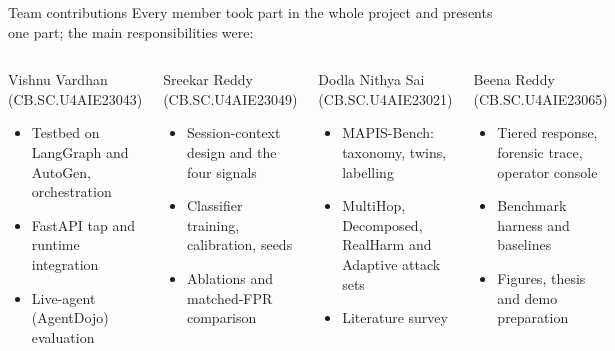 \documentclass[aspectratio=169,10pt]{beamer}
\newcommand{\MemberA}{Dodla Nithya Sai (CB.SC.U4AIE23021)}
\newcommand{\MemberB}{Vishnu Vardhan (CB.SC.U4AIE23043)}
\newcommand{\MemberC}{Sreekar Reddy (CB.SC.U4AIE23049)}
\newcommand{\MemberD}{Beena Reddy (CB.SC.U4AIE23065)}
\begin{document}
\begin{frame}{Team contributions}
  \small Every member took part in the whole project and presents one part; the main responsibilities were:\\[3mm]
  \begin{columns}[T]
    \begin{block}{\MemberB}
      \small
      \begin{itemize}
        \item Testbed on LangGraph and AutoGen, orchestration
        \item FastAPI tap and runtime integration
        \item Live-agent (AgentDojo) evaluation
      \end{itemize}
    \end{block}
    \begin{block}{\MemberC}
      \small
      \begin{itemize}
        \item Session-context design and the four signals
        \item Classifier training, calibration, seeds
        \item Ablations and matched-FPR comparison
      \end{itemize}
    \end{block}
    \begin{block}{\MemberA}
      \small
      \begin{itemize}
        \item MAPIS-Bench: taxonomy, twins, labelling
        \item MultiHop, Decomposed, RealHarm and Adaptive attack sets
        \item Literature survey
      \end{itemize}
    \end{block}
    \begin{block}{\MemberD}
      \small
      \begin{itemize}
        \item Tiered response, forensic trace, operator console
        \item Benchmark harness and baselines
        \item Figures, thesis and demo preparation
      \end{itemize}
    \end{block}
  \end{columns}
\end{frame}
\end{document}

